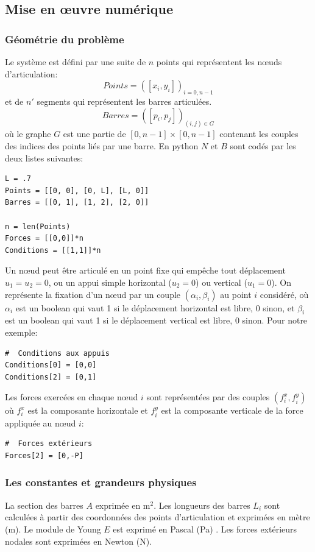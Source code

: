 \documentclass[a4paper]{article}
\begin{document}
\subsection{Mise en œuvre numérique}
\subsubsection{Géométrie du problème}
Le système est défini par une suite de $n$ points qui représentent les nœuds d'articulation:
\[Points=\left([x_i,y_i]\right)_{i=0,n-1}\]
et de $n'$ segments qui représentent les barres articulées.
\[Barres=\left([p_i,p_j]\right)_{(i,j)\in G}\]
où le graphe $G$ est une partie de $[0,n-1]\times [0,n-1]$ contenant les couples des indices des points liés par une barre. En python $N$ et $B$ sont codés par les deux listes suivantes:
\begin{verbatim}
L = .7
Points = [[0, 0], [0, L], [L, 0]]
Barres = [[0, 1], [1, 2], [2, 0]]

n = len(Points)
Forces = [[0,0]]*n
Conditions = [[1,1]]*n
\end{verbatim}
Un nœud peut être articulé en un point fixe qui empêche tout déplacement  $u_1=u_2=0$, ou un appui simple horizontal ($u_2=0$) ou vertical ($u_1=0$). On représente la fixation d'un nœud par un couple $\left(\alpha_i,\beta_i\right)$ au point $i$  considéré,  où $\alpha_i$ est un boolean qui vaut 1 si le déplacement horizontal est libre, 0 sinon, et $\beta_i$ est un boolean qui vaut 1 si le déplacement vertical est libre, 0 sinon. Pour notre exemple:
\begin{verbatim}
#  Conditions aux appuis
Conditions[0] = [0,0]
Conditions[2] = [0,1]
\end{verbatim}
Les forces exercées en chaque nœud  $i$ sont représentées par des couples $(f_{i}^x,f_i^y)$ où $f_i^x$ est la composante horizontale et $f_i^y$ est la composante verticale de la force appliquée au nœud $i$:
\begin{verbatim}
#  Forces extérieurs
Forces[2] = [0,-P]
\end{verbatim}
\subsubsection{Les constantes et grandeurs physiques}
La section des barres $A$ exprimée en $\mbox{m}^2$. Les longueurs des barres $L_i$ sont calculées à partir des coordonnées des points d'articulation et exprimées en mètre (m). Le module de Young $E$ est exprimé en Pascal (Pa) . Les forces extérieurs nodales sont exprimées en Newton (N).
\end{document}
